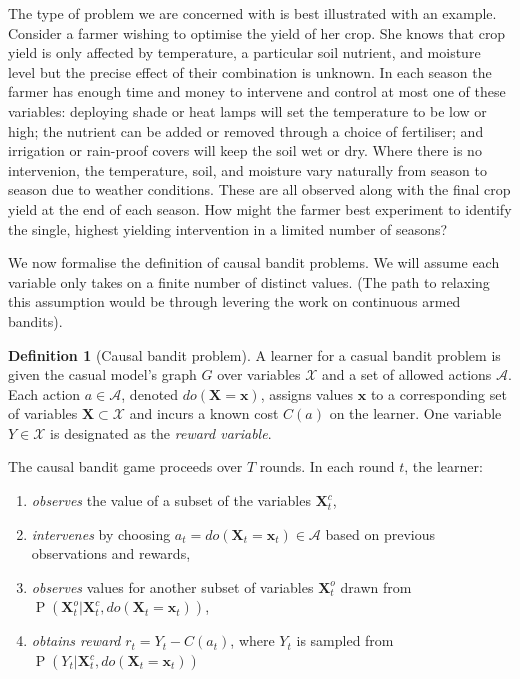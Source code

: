 \documentclass[11pt,a4paper,twoside]{report}
\newcommand{\actionspace}{\mathcal{A}}
\renewcommand{\P}[1]{\operatorname{P}\left(#1\right)}
\renewcommand{\vec}[1]{\boldsymbol{#1}}
\theoremstyle{plain}
\theoremstyle{definition}
\newtheorem{definition}[theorem]{Definition}
\begin{document}
The type of problem we are concerned with is best illustrated with an example. Consider a farmer wishing to optimise the yield of her crop. She knows that crop yield is only affected by temperature, a particular soil nutrient, and moisture level but the precise effect of their combination is unknown. In each season the farmer has enough time and money to intervene and control at most one of these
variables: deploying shade or heat lamps will set the temperature to be low or high; the nutrient can be added or removed through a choice of fertiliser; and irrigation or rain-proof covers will keep the soil wet or dry. Where there is no intervenion, the temperature, soil, and moisture vary naturally from season to season due to weather conditions. These are all observed along with the final crop yield at the end of each season. How might the farmer best experiment to identify the single, highest yielding intervention in a limited number of seasons?

We now formalise the definition of causal bandit problems. We will assume each variable only takes on a finite number of distinct values. (The path to relaxing this assumption would be through levering the work on continuous armed bandits). 

\vspace*{.5cm}
\begin{definition}[Causal bandit problem]
A learner for a casual bandit problem is given the casual model’s graph $G$ over variables $\mathcal{X}$ and a set of allowed actions $\actionspace$. Each action $a \in \actionspace$, denoted $do(\vec{X}=\vec{x})$, assigns values $\vec{x}$ to a corresponding set of variables $\vec{X} \subset \mathcal{X}$ and incurs a known cost $C(a)$ on the learner. One variable $Y \in \mathcal{X}$ is designated as the \emph{reward variable}.

The causal bandit game proceeds over $T$ rounds. In each round $t$, the learner:
\begin{enumerate}
\item \emph{observes} the value of a subset of the variables $\vec{X}^c_t$,
\item \emph{intervenes} by choosing $a_t = do(\vec{X}_t = \vec{x}_t) \in \mathcal{A}$ based on previous observations and rewards, 
\item \emph{observes} values for another subset of variables $\vec{X}^o_t$ drawn from $\P{\vec{X}^o_t |\vec{X}^c_t, do(\vec{X}_t = \vec{x}_t)}$,
\item \emph{obtains reward} $r_t = Y_t - C(a_t)$, where $Y_t$ is sampled from $\P{Y_t| \vec{X}^c_t, do(\vec{X}_t = \vec{x}_t)}$
\end{enumerate} 
\end{definition}
\end{document}
